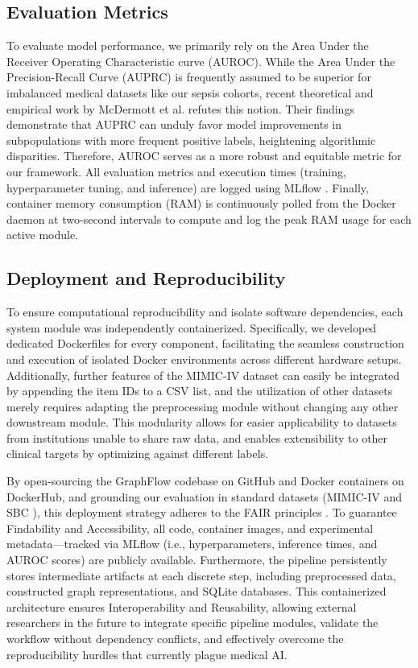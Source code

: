\documentclass[pdflatex,sn-mathphys-num,lineno]{sn-jnl}
\theoremstyle{thmstyleone}%
\theoremstyle{thmstyletwo}%
\theoremstyle{thmstylethree}%
\begin{document}
\subsection{Evaluation Metrics}\label{methods:evaluation}
To evaluate model performance, we primarily rely on the Area Under the Receiver Operating Characteristic curve (AUROC). While the Area Under the Precision-Recall Curve (AUPRC) is frequently assumed to be superior for imbalanced medical datasets like our sepsis cohorts, recent theoretical and empirical work by McDermott et al. \cite{NEURIPS2024_4df3510a} refutes this notion. Their findings demonstrate that AUPRC can unduly favor model improvements in subpopulations with more frequent positive labels, heightening algorithmic disparities. Therefore, AUROC serves as a more robust and equitable metric for our framework. All evaluation metrics and execution times (training, hyperparameter tuning, and inference) are logged using MLflow \cite{Zaharia_Accelerating_the_Machine_2018}. Finally, container memory consumption (RAM) is continuously polled from the Docker daemon at two-second intervals to compute and log the peak RAM usage for each active module. 

\subsection{Deployment and Reproducibility}\label{methods:deployment}
To ensure computational reproducibility and isolate software dependencies, each system module was independently containerized. Specifically, we developed dedicated Dockerfiles for every component, facilitating the seamless construction and execution of isolated Docker environments across different hardware setups. Additionally, further features of the MIMIC-IV dataset can easily be integrated by appending the item IDs to a CSV list, and the utilization of other datasets merely requires adapting the preprocessing module without changing any other downstream module. This modularity allows for easier applicability to datasets from institutions unable to share raw data, and enables extensibility to other clinical targets by optimizing against different labels.

By open-sourcing the GraphFlow codebase on GitHub and Docker containers on DockerHub, and grounding our evaluation in standard datasets (MIMIC-IV \cite{johnson2023mimic} and SBC \cite{steinbach2024applying}), this deployment strategy adheres to the FAIR principles \cite{Wilkinson2016}. To guarantee Findability and Accessibility, all code, container images, and experimental metadata—tracked via MLflow (i.e., hyperparameters, inference times, and AUROC scores) are publicly available. Furthermore, the pipeline persistently stores intermediate artifacts at each discrete step, including preprocessed data, constructed graph representations, and SQLite databases. This containerized architecture ensures Interoperability and Reusability, allowing external researchers in the future to integrate specific pipeline modules, validate the workflow without dependency conflicts, and effectively overcome the reproducibility hurdles that currently plague medical AI.
\end{document}
